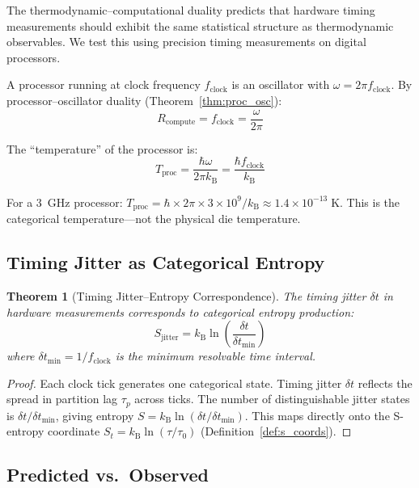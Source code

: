 \documentclass[twocolumn,10pt,a4paper]{article}
\theoremstyle{plain}
\newtheorem{theorem}{Theorem}[section]
\theoremstyle{definition}
\theoremstyle{remark}
\newcommand{\kB}{k_{\mathrm{B}}}
\newcommand{\St}{S_t}
\newcommand{\taup}{\tau_p}
\begin{document}
The thermodynamic--computational duality predicts that hardware timing measurements should exhibit the same statistical structure as thermodynamic observables. We test this using precision timing measurements on digital processors.

A processor running at clock frequency $f_{\mathrm{clock}}$ is an oscillator with $\omega = 2\pi f_{\mathrm{clock}}$. By processor--oscillator duality (Theorem~\ref{thm:proc_osc}):
\begin{equation}
    R_{\mathrm{compute}} = f_{\mathrm{clock}} = \frac{\omega}{2\pi}
\end{equation}

The ``temperature'' of the processor is:
\begin{equation}
    T_{\mathrm{proc}} = \frac{\hbar \omega}{2\pi \kB} = \frac{\hbar f_{\mathrm{clock}}}{\kB}
\end{equation}

For a 3~GHz processor: $T_{\mathrm{proc}} = \hbar \times 2\pi \times 3 \times 10^9 / \kB \approx 1.4 \times 10^{-13}\;\mathrm{K}$. This is the categorical temperature---not the physical die temperature.

\subsection{Timing Jitter as Categorical Entropy}

\begin{theorem}[Timing Jitter--Entropy Correspondence]
\label{thm:jitter}
The timing jitter $\delta t$ in hardware measurements corresponds to categorical entropy production:
\begin{equation}
    S_{\mathrm{jitter}} = \kB \ln\!\left(\frac{\delta t}{\delta t_{\min}}\right)
\end{equation}
where $\delta t_{\min} = 1/f_{\mathrm{clock}}$ is the minimum resolvable time interval.
\end{theorem}

\begin{proof}
Each clock tick generates one categorical state. Timing jitter $\delta t$ reflects the spread in partition lag $\taup$ across ticks. The number of distinguishable jitter states is $\delta t / \delta t_{\min}$, giving entropy $S = \kB \ln(\delta t / \delta t_{\min})$. This maps directly onto the S-entropy coordinate $\St = \kB \ln(\tau/\tau_0)$ (Definition~\ref{def:s_coords}).
\end{proof}

\subsection{Predicted vs.\ Observed}
\end{document}
